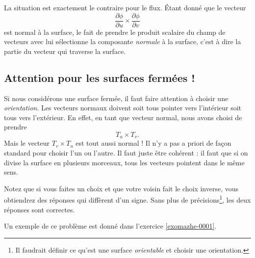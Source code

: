 La situation est exactement le contraire pour le flux. Étant donné que le vecteur
\begin{equation}
    \frac{ \partial \phi }{ \partial u }\times\frac{ \partial \phi }{ \partial v }
\end{equation}
est normal à la surface, le fait de prendre le produit scalaire du champ de vecteurs avec lui sélectionne la composante \emph{normale} à la surface, c'est à dire la partie du vecteur qui traverse la surface.

\subsection{Attention pour les surfaces fermées !}

Si nous considérons une surface fermée, il faut faire attention à choisir une \emph{orientation}. Les vecteurs normaux doivent soit tous pointer vers l'intérieur soit tous vers l'extérieur. En effet, en tant que vecteur normal, nous avons choisi de prendre
\begin{equation}
    T_u\times T_v.
\end{equation}
Mais le vecteur $T_v\times T_u$ est tout aussi normal ! Il n'y a pas a priori de façon standard pour choisir l'un ou l'autre. Il faut juste être cohérent : il faut que si on divise la surface en plusieurs morceaux, tous les vecteurs pointent dans le même sens.

Notez que si vous faites un choix et que votre voisin fait le choix inverse, vous obtiendrez des réponses qui diffèrent d'un signe. Sans plus de précisions\footnote{Il faudrait définir ce qu'est une surface \emph{orientable} et choisir une orientation.}, les deux réponses sont correctes.

Un exemple de ce problème est donné dans l'exercice \ref{exomazhe-0001}.



